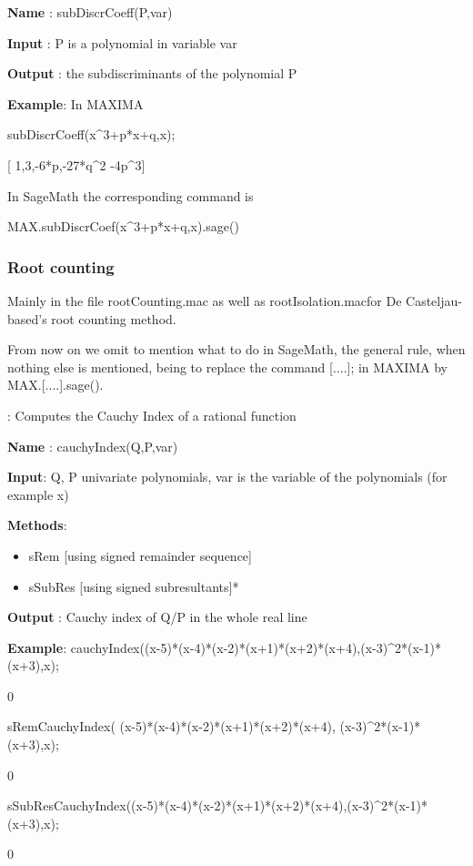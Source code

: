 \documentclass{article}
\begin{document}
 {\bf Name} : subDiscrCoeff(P,var)
  
 {\bf Input} : P is a polynomial in variable var
  
  {\bf Output} : the subdiscriminants of the polynomial P
  
 {\bf Example}: In MAXIMA
 
 subDiscrCoeff(x\^{}3+p*x+q,x);
 
  [ 1,3,-6*p,-27*q\^{}{2} -4p\^{}{3}]
  
   \noindent In SageMath the corresponding command is 
  
  MAX.subDiscrCoef(x\^{}3+p*x+q,x).sage()
  
\subsubsection{Root counting}

Mainly in the file rootCounting.mac as well as rootIsolation.macfor De Casteljau-based's root
counting method.

From now on we omit to mention what to do in SageMath, the general rule, when nothing else is mentioned, being to replace
the command [....]; in MAXIMA by MAX.[....].sage(). 

:
  Computes the Cauchy Index of a rational function
  
 {\bf Name} : cauchyIndex(Q,P,var)
  
 {\bf  Input}: Q, P univariate polynomials, var is the variable of the polynomials (for example x)
  
 {\bf   Methods}:
  \begin{itemize}
    \item sRem [using signed remainder sequence]
    \item sSubRes [using signed subresultants]*
  \end{itemize}
  
 {\bf  Output} : Cauchy index of Q/P in the whole real line
  
 {\bf Example}:
  cauchyIndex((x-5)*(x-4)*(x-2)*(x+1)*(x+2)*(x+4),(x-3)\^{}2*(x-1)*(x+3),x);
  
   0
   
   sRemCauchyIndex( (x-5)*(x-4)*(x-2)*(x+1)*(x+2)*(x+4), (x-3)\^{}2*(x-1)*(x+3),x);
   
   0
   
   sSubResCauchyIndex((x-5)*(x-4)*(x-2)*(x+1)*(x+2)*(x+4),(x-3)\^{}2*(x-1)*(x+3),x);
   
   0
\end{document}
